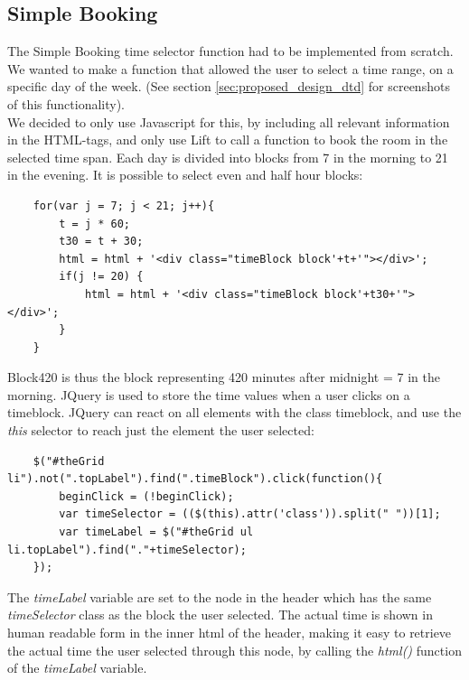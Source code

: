 \subsection{Simple Booking}
The Simple Booking time selector function had to be implemented from scratch. We wanted to make a function that allowed the user to select a time range, on a specific day of the week. (See section \ref{sec:proposed_design_dtd} for screenshots of this functionality). \\
We decided to only use Javascript for this, by including all relevant information in the HTML-tags, and only use Lift to call a function to book the room in the selected time span. Each day is divided into blocks from 7 in the morning to 21 in the evening. It is possible to select even and half hour blocks:

\begin{verbatim}
    for(var j = 7; j < 21; j++){
        t = j * 60;
        t30 = t + 30;
        html = html + '<div class="timeBlock block'+t+'"></div>';
        if(j != 20) {
            html = html + '<div class="timeBlock block'+t30+'"></div>';	
        }
    }
\end{verbatim}

Block420 is thus the block representing 420 minutes after midnight = 7 in the morning. JQuery is used to store the time values when a user clicks on a timeblock. JQuery can react on all elements with the class timeblock, and use the \emph{this} selector to reach just the element the user selected:

\begin{verbatim}
    $("#theGrid li").not(".topLabel").find(".timeBlock").click(function(){
        beginClick = (!beginClick);
        var timeSelector = (($(this).attr('class')).split(" "))[1];
        var timeLabel = $("#theGrid ul li.topLabel").find("."+timeSelector);
    });
\end{verbatim}

The \emph{timeLabel} variable are set to the node in the header which has the same \emph{timeSelector} class as the block the user selected. The actual time is shown in human readable form in the inner html of the header, making it easy to retrieve the actual time the user selected through this node, by calling the \emph{html()} function of the \emph{timeLabel} variable.